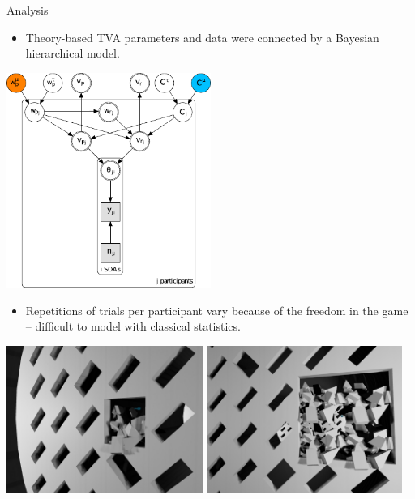 \documentclass[a0paper,portrait]{baposter}
\begin{document}
\begin{poster}
		\begin{posterbox}[name=results,span=1,column=2,row=0]{Analysis}
			\begin{itemize}
				\item Theory-based TVA parameters and data were connected by a Bayesian hierarchical model.
			\end{itemize}
			\begin{center}
				\includegraphics[width=0.5\textwidth]{graphmod.pdf}
			\end{center}
			\begin{itemize}
				\item Repetitions of trials per participant vary because of the freedom in the game -- difficult to model with classical statistics.
			\end{itemize}
			
			\begin{center}
				\includegraphics[width=0.48\textwidth]{unclear.jpg}
				\includegraphics[width=0.48\textwidth]{unclear2.jpg}
			\end{center}
			

\end{posterbox}
\end{poster}
\end{document}
